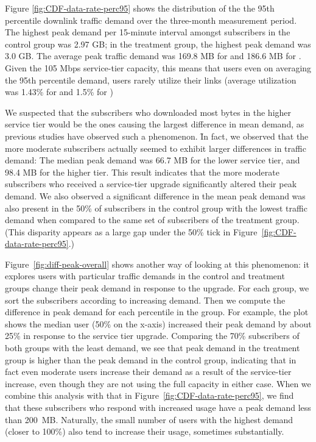 Figure \ref{fig:CDF-data-rate-perc95} shows the distribution of the the
95th percentile downlink traffic demand over the three-month measurement
period. The highest peak demand per 15-minute interval amongst
subscribers in the control group was 2.97 GB; in the treatment group,
the highest peak demand was 3.0 GB.
The average peak traffic demand was 169.8 MB for \control{} and
186.6 MB for \treatment{}. Given the 105 Mbps service-tier capacity,
this means that users even on averaging the 95th percentile demand,
users rarely utilize their links (average utilization was 1.43\%
for \control{} and 1.5\% for \treatment{})

We suspected that the subscribers who downloaded most bytes in the
higher service tier would be the ones causing the largest difference in
mean demand, as previous studies have observed such a phenomenon. \f{In
  fact, we observed that the more moderate subscribers actually seemed
  to exhibit larger differences in traffic demand: The median peak demand
  was 66.7 MB for the lower service tier, and 98.4 MB for the higher
  tier.  This result indicates that the more moderate subscribers who
  received a service-tier upgrade significantly altered their peak
  demand.}  We also observed a significant difference in the mean peak
demand was also present in the 50\% of subscribers in the control group
with the lowest traffic demand when compared to the same set of
subscribers of the treatment group. (This disparity appears as a large
gap under the 50\% tick in Figure~\ref{fig:CDF-data-rate-perc95}.)


Figure~\ref{fig:diff-peak-overall} shows another way of looking at this
phenomenon: it explores users with particular traffic demands in the
control and treatment groups change their peak demand in response to the
upgrade.  For each group, we sort the subscribers according to
increasing demand.  Then we compute the difference in peak demand for
each percentile in the group.  For example, the plot shows the median
user (50\% on the x-axis) increased their peak demand by about 25\% in
response to the service tier upgrade.  Comparing the 70\% subscribers of
both groups with the least demand, we see that peak demand in the
treatment group is higher than the peak demand in the control group,
indicating that in fact even moderate users increase their demand as a
result of the service-tier increase, even though they are not using the
full capacity in either case.
When we combine this analysis with that in
Figure~\ref{fig:CDF-data-rate-perc95}, we find that these subscribers
who respond with increased usage have a peak demand less than 200~MB.
Naturally, the small number of users with the highest demand (closer to
100\%) also tend to increase their usage, sometimes substantially.


